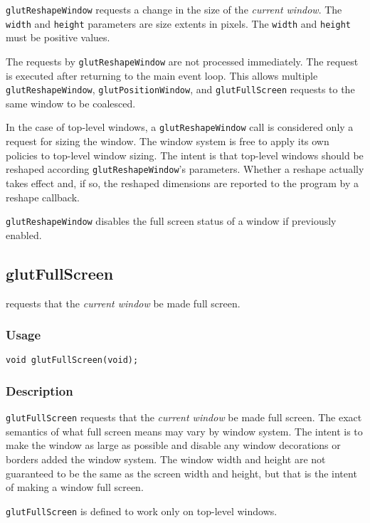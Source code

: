 {\tt glutReshapeWindow} requests a change in the size of
the {\em current window}.
The {\tt width} and {\tt height} parameters are
size extents in pixels.  The {\tt width} and {\tt height} must
be positive values.

The requests by {\tt glutReshapeWindow} are not processed immediately.
The request is executed after returning to the main event loop.
This allows multiple {\tt glutReshapeWindow}, {\tt glutPositionWindow},
and {\tt glutFullScreen}
requests to the same window to be coalesced.

In the case of top-level windows, a {\tt glutReshapeWindow} call
is considered only a request for sizing the window.
The window system is free to apply its own policies to top-level
window sizing.  The intent is that top-level windows
should be reshaped according {\tt glutReshapeWindow}'s parameters.
Whether a reshape actually takes effect and, if so, the reshaped dimensions
are reported to the program by a reshape callback.

{\tt glutReshapeWindow} disables the full screen status of a window
if previously enabled.

\subsection{glutFullScreen}

 requests that the {\em current window} be made full screen.

\subsubsection*{Usage}
\begin{verbatim}
void glutFullScreen(void);
\end{verbatim}

\subsubsection*{Description}

{\tt glutFullScreen} requests that the {\em current window} be made
full screen.  The exact semantics of what full screen means may vary by
window system.  The intent is to make the window as large as possible
and disable any window decorations or borders added the window
system.  The window width and height are not guaranteed to be the same
as the screen width and height, but that is the intent of making a
window full screen.

{\tt glutFullScreen} is defined to work only on top-level windows.

